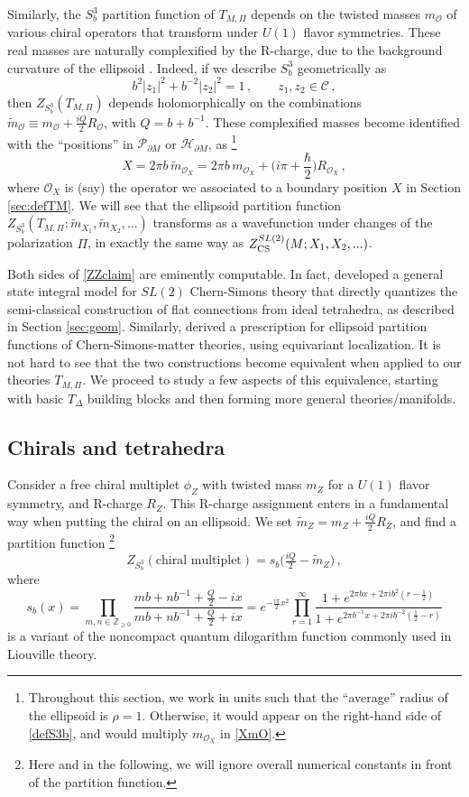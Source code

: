 \documentclass[hyper,letterpaper]{JHEP3}
\numberwithin{equation}{section}
\newcommand{\be}{\begin{equation}}
\newcommand{\ee}{\end{equation}}
\newcommand{\Z}{{\mathbb Z}}
\newcommand{\pd}{\partial}
\newcommand{\CC}{\mathcal{C}}
\newcommand{\CH}{\mathcal{H}}
\newcommand{\CO}{\mathcal{O}}
\newcommand{\CP}{\mathcal{P}}
\begin{document}
Similarly, the $S^3_b$ partition function of $T_{M,\Pi}$ depends on the twisted masses $m_\CO$ of various chiral operators that transform under $U(1)$ flavor symmetries. These real masses are naturally complexified by the R-charge, due to the background curvature of the ellipsoid \cite{Kapustin-3dloc, HHL}. Indeed, if we describe $S^3_b$ geometrically as
%
\be b^2|z_1|^2+b^{-2}|z_2|^2 = 1\,,\qquad z_1,z_2\in\CC\,, \label{defS3b}\ee
%
then $Z_{S^3_b}(T_{M,\Pi})$ depends holomorphically on the combinations $\tilde m_\CO \equiv m_\CO+\frac{iQ}{2}R_\CO$, with $Q=b+b^{-1}$. These complexified masses become identified with the ``positions'' in $\CP_{\pd M}$ or $\CH_{\pd M}$, as%
%
\footnote{Throughout this section, we work in units such that the ``average'' radius of the ellipsoid is $\rho=1$. Otherwise, it would appear on the right-hand side of \eqref{defS3b}, and would multiply $m_{\CO_X}$ in \eqref{XmO}.}
%
\be \label{XmO}
X = 2\pi b\,
 \tilde m_{\CO_X}= 2\pi b\,m_{\CO_X}+\Big(i\pi+\frac\hbar2\Big)R_{\CO_X}\,,
\ee
%
where $\CO_X$ is (say) the operator we associated to a boundary position $X$ in Section \ref{sec:defTM}. We will see that the ellipsoid partition function $Z_{S^3_b}(T_{M,\Pi};\tilde m_{X_1},\tilde m_{X_2},...)$ transforms as a wavefunction under changes of the polarization $\Pi$, in exactly the same way as $Z^{SL(2)}_{\rm CS}(M;X_1,X_2,...)$.

Both sides of \eqref{ZZclaim} are eminently computable. In fact, \cite{Dimofte-QRS} developed a general state integral model for $SL(2)$ Chern-Simons theory that directly quantizes the semi-classical construction of flat connections from ideal tetrahedra, as described in Section \ref{sec:geom}. Similarly, \cite{HHL} derived a prescription for ellipsoid partition functions of Chern-Simons-matter theories, using equivariant localization. It is not hard to see that the two constructions become equivalent when applied to our theories $T_{M,\Pi}$. We proceed to study a few aspects of this equivalence, starting with basic $T_\Delta$ building blocks and then forming more general theories/manifolds.


\subsection{Chirals and tetrahedra}
\label{sec:S3tet}

Consider a free chiral multiplet $\phi_Z$ with twisted mass $m_Z$ for a $U(1)$ flavor symmetry, and R-charge $R_Z$. This R-charge assignment enters in a fundamental way when putting the chiral on an ellipsoid. We set $\tilde m_Z = m_Z+\frac{iQ}{2}R_Z$, and find a partition function%
%
\footnote{Here and in the following, we will ignore overall numerical constants in front of the partition function.} %
%
\cite{HHL}
%
\be Z_{S^3_b}(\text{chiral multiplet}) = s_b\big(\tfrac{iQ}{2}-\tilde m_Z\big)\,, \label{Zchiral} \ee
%
where
%
\be s_b(x) = \prod_{m,n \in \Z_{\ge 0}} \frac{mb + nb^{-1} + \tfrac{Q}{2}-ix}{mb + nb^{-1} + \tfrac{Q}{2}+ix} = e^{-\frac{i\pi}{2}x^2}\prod_{r=1}^\infty\frac{1+e^{2\pi bx+2\pi i b^2(r-\tfrac12)}}
 {1+e^{2\pi b^{-1}x+2\pi ib^{-2}(\tfrac12-r)}}
\label{sbdef}
\ee
%
is a variant of the noncompact quantum dilogarithm function \cite{Barnes-QDL, Fad-modular} commonly used in Liouville theory.
\end{document}
